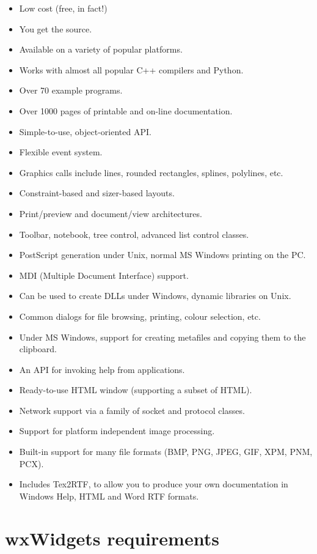\begin{itemize}\itemsep=0pt
\item Low cost (free, in fact!)
\item You get the source.
\item Available on a variety of popular platforms.
\item Works with almost all popular C++ compilers and Python.
\item Over 70 example programs.
\item Over 1000 pages of printable and on-line documentation.
\item Simple-to-use, object-oriented API.
\item Flexible event system.
\item Graphics calls include lines, rounded rectangles, splines, polylines, etc.
\item Constraint-based and sizer-based layouts.
\item Print/preview and document/view architectures.
\item Toolbar, notebook, tree control, advanced list control classes.
\item PostScript generation under Unix, normal MS Windows printing on the PC.
\item MDI (Multiple Document Interface) support.
\item Can be used to create DLLs under Windows, dynamic libraries on Unix.
\item Common dialogs for file browsing, printing, colour selection, etc.
\item Under MS Windows, support for creating metafiles and copying
them to the clipboard.
\item An API for invoking help from applications.
\item Ready-to-use HTML window (supporting a subset of HTML).
\item Network support via a family of socket and protocol classes.
\item Support for platform independent image processing.
\item Built-in support for many file formats (BMP, PNG, JPEG, GIF, XPM, PNM, PCX).
\item Includes Tex2RTF, to allow you to produce your own documentation
in Windows Help, HTML and Word RTF formats.
\end{itemize}

\section{wxWidgets requirements}\label{requirements}

